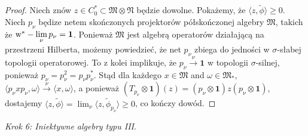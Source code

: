 \begin{proof}
Niech znów $z \in C_{0}^{*} \subset \mathfrak{M} \otimes \mathfrak{N}$
będzie dowolne.
Pokażemy, że $\langle z, \tilde{\phi} \rangle \geq 0$.
Niech $p_{\nu}$ będize netem skończonych projektorów
półskończonej algebry $\mathfrak{M}$,
takich że ${\rm w}^*-\lim \limits_{\nu} p_{\nu} = \mathbf{1}$.
Ponieważ $\mathfrak{M}$ jest algebrą operatorów działającą
na przestrzeni Hilberta,
możemy powiedzieć, że net $p_{\nu}$ zbiega do jedności w
$\sigma$-słabej topologii operatorowej.
To z kolei implikuje, że
$p_{\nu} \stackrel{\nu}{\rightarrow} \mathbf{1}$ w topologii $\sigma$-silnej,
ponieważ $p_{\nu} = p_{\nu}^2= p_{\nu} p_{\nu}^{*}$.
Stąd dla każdego $x \in \mathfrak{M}$ and $\omega \in \mathfrak{M}_{*}$,
$\langle p_{\nu} x p_{\nu}, \omega \rangle\stackrel{\nu}{\rightarrow}
\langle x, \omega \rangle$, a ponieważ
$(T_{p_{\nu}} \otimes \mathbf{1})(z) =
(p_{\nu} \otimes \mathbf{1}) z (p_{\nu} \otimes \mathbf{1})$,
dostajemy $\langle z, \tilde{\phi} \rangle
= \lim_{\nu} \langle z, \tilde{\phi}_{p_{\nu}} \rangle \geq 0$,
co kończy dowód.
\end{proof}

{\it Krok 6: Iniektywne algebry typu III}.

